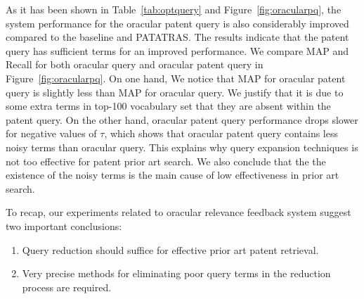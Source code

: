 As it has been shown in Table~\ref{tab:optquery} and Figure~\ref{fig:oracularpq}, the system performance for the oracular patent query is also considerably improved compared to the baseline and PATATRAS.
The results indicate that the patent query has sufficient terms for an improved performance. 
We compare MAP and Recall for both oracular query and oracular patent query in Figure~\ref{fig:oracularpq}. 
On one hand, We notice that MAP for oracular patent query is slightly less than MAP for oracular query. We justify that it is due to some extra terms in top-100 vocabulary set that they are absent within the patent query. On the other hand, oracular patent query performance drops slower for negative values of $\tau$, which shows that oracular patent query contains less noisy terms than oracular query. 
This explains why query expansion techniques is not too effective for patent prior art search. We also conclude that the the existence of the noisy terms is the main cause of low effectiveness in prior art search.  

To recap, our experiments related to oracular relevance feedback system
suggest two important conclusions: 
\begin{enumerate}
\item Query reduction should suffice for effective prior art patent retrieval.
\item Very precise methods for eliminating poor query terms in the reduction process are required.
\end{enumerate}

%

